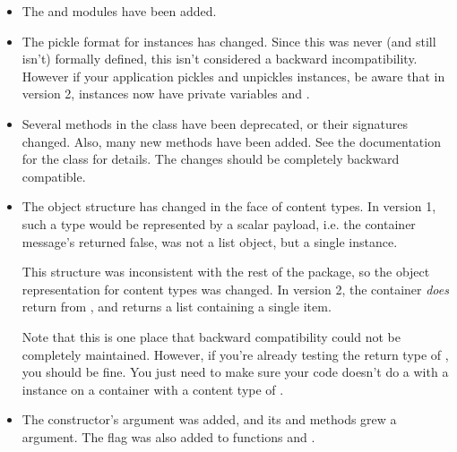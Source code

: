 \begin{itemize}
\item The  and  modules
      have been added.

\item The pickle format for  instances has changed.
      Since this was never (and still isn't) formally defined, this
      isn't considered a backward incompatibility.  However if your
      application pickles and unpickles  instances, be
      aware that in  version 2, 
      instances now have private variables  and
      .

\item Several methods in the  class have been
      deprecated, or their signatures changed.  Also, many new methods
      have been added.  See the documentation for the 
      class for details.  The changes should be completely backward
      compatible.

\item The object structure has changed in the face of
       content types.  In 
      version 1, such a type would be represented by a scalar payload,
      i.e. the container message's  returned
      false,  was not a list object, but a single
       instance.

      This structure was inconsistent with the rest of the package, so
      the object representation for  content
      types was changed.  In  version 2, the container
      \emph{does} return  from , and
       returns a list containing a single
       item.

      Note that this is one place that backward compatibility could
      not be completely maintained.  However, if you're already
      testing the return type of , you should be
      fine.  You just need to make sure your code doesn't do a
       with a  instance on a
      container with a content type of .

\item The  constructor's  argument was
      added, and its  and  methods
      grew a  argument.  The  flag was
      also added to functions 
      and .


\end{itemize}

